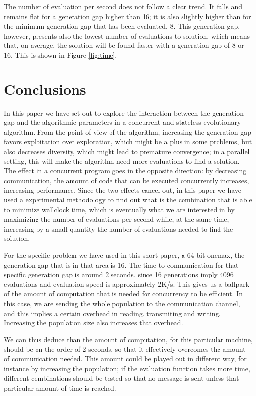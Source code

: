 \documentclass[sigconf]{acmart}
\begin{document}
The number of evaluation per second does not follow a clear trend. It
falls and remains flat for a generation gap higher than 16; it is also slightly higher than for the minimum
generation gap that has been evaluated, 8. This generation gap,
however, presents also the lowest number of evaluations to solution,
which means that, on average, the solution will be found faster with a
generation gap of 8 or 16. This is shown in Figure \ref{fig:time}.

\section{Conclusions}
\label{sec:conclusions}
In this paper we have set out to explore the interaction between the
generation gap and the algorithmic parameters in a concurrent and stateless evolutionary algorithm. From the point of view
of the algorithm, increasing the generation gap favors exploitation
over exploration, which might be a plus in some problems, but also
decreases diversity, which might lead to premature convergence; in a
parallel setting, this will make the algorithm need more evaluations
to find a solution. The effect in a concurrent program goes in the
opposite direction: by decreasing communication, the amount of
code that can be executed concurrently increases, increasing
performance. Since the two effects cancel out, in this paper we have
used a experimental methodology to find out what is the combination
that is able to minimize wallclock time, which is eventually what we
are interested in by maximizing the number of evaluations per second
while, at the same time, increasing by a small quantity the number of
evaluations needed to find the solution.

For the specific problem we have used in this short paper, a 64-bit
onemax, the generation gap that is in that area is 16. The time to
communication for that specific generation gap is around 2 seconds,
since 16 generations imply 4096 evaluations and evaluation speed is
approximately 2K/s. This gives us a ballpark of the amount of
computation that is needed for concurrency to be efficient. In this
case, we are sending the whole population to the communication
channel, and this implies a certain overhead in reading, transmiting
and writing. Increasing the population size also increases that
overhead.

We can thus deduce than the amount of computation, for this particular
machine, should be on the order of 2 seconds, so that it effectively
overcomes the amount of communication needed. This amount could be
played out in different way, for instance by increasing the
population; if the evaluation function takes more time, different
combinations should be tested so that no message is sent unless that
particular amount of time is reached.
\end{document}
